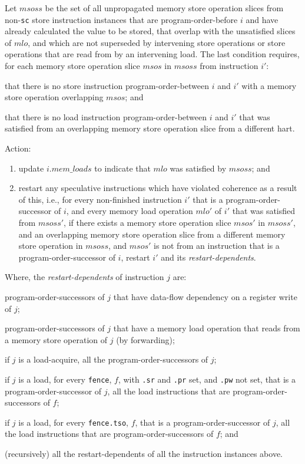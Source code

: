 Let $msoss$ be the set of all unpropagated memory store operation slices from non-{\tt sc} store instruction instances that are program-order-before $i$ and have already calculated the value to be stored, that overlap with the unsatisfied slices of $mlo$, and which are not superseded by intervening store operations or store operations that are read from by an intervening load.
The last condition requires, for each memory store operation slice $msos$ in $msoss$ from instruction $i'$:
\begin{tightlist}
\item that there is no store instruction program-order-between $i$ and $i'$ with a memory store operation overlapping $msos$; and
\item that there is no load instruction program-order-between $i$ and $i'$ that was satisfied from an overlapping memory store operation slice from a different hart.
\end{tightlist}

Action:
\begin{enumerate}
\item update $i.\textit{mem\_loads}$ to indicate that $mlo$ was satisfied by $msoss$; and
\item restart any speculative instructions which have violated coherence as a result of this, i.e., for every non-finished instruction $i'$ that is a program-order-successor of $i$, and every memory load operation $mlo'$ of $i'$ that was satisfied from $msoss'$, if there exists a memory store operation slice $msos'$ in $msoss'$, and an overlapping memory store operation slice from a different memory store operation in $msoss$, and $msos'$ is not from an instruction that is a program-order-successor of $i$, restart $i'$ and its {\em restart-dependents}.
\end{enumerate}
Where, the {\em restart-dependents} of instruction $j$ are:
\begin{tightlist}
\item program-order-successors of $j$ that have data-flow dependency on a register write of $j$;
\item program-order-successors of $j$ that have a memory load operation that reads from a memory store operation of $j$ (by forwarding);
\item if $j$ is a load-acquire, all the program-order-successors of $j$;
\item if $j$ is a load, for every {\tt fence}, $f$, with {\tt .sr} and {\tt .pr} set, and {\tt .pw} not set, that is a program-order-successor of $j$, all the load instructions that are program-order-successors of $f$;
\item if $j$ is a load, for every {\tt fence.tso}, $f$, that is a program-order-successor of $j$, all the load instructions that are program-order-successors of $f$;
and \item (recursively) all the restart-dependents of all the instruction instances above.
\end{tightlist}


